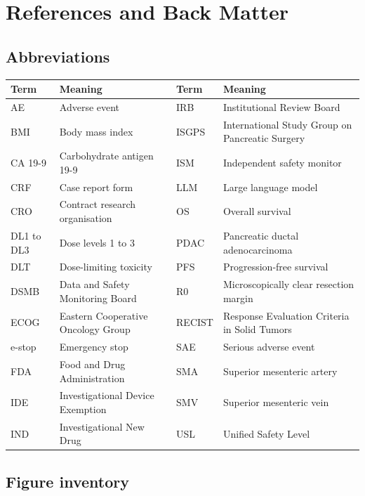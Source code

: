 \section{References and Back Matter}

\subsection{Abbreviations}

\vspace{0.30em}

\noindent\begin{tabularx}{\textwidth}{L{2.3cm} Y L{2.3cm} Y}
\toprule
\textbf{Term} & \textbf{Meaning} & \textbf{Term} & \textbf{Meaning} \\
\midrule
AE & Adverse event & IRB & Institutional Review Board \\
BMI & Body mass index & ISGPS & International Study Group on Pancreatic Surgery \\
CA 19-9 & Carbohydrate antigen 19-9 & ISM & Independent safety monitor \\
CRF & Case report form & LLM & Large language model \\
CRO & Contract research organisation & OS & Overall survival \\
DL1 to DL3 & Dose levels 1 to 3 & PDAC & Pancreatic ductal adenocarcinoma \\
DLT & Dose-limiting toxicity & PFS & Progression-free survival \\
DSMB & Data and Safety Monitoring Board & R0 & Microscopically clear resection margin \\
ECOG & Eastern Cooperative Oncology Group & RECIST & Response Evaluation Criteria in Solid Tumors \\
e-stop & Emergency stop & SAE & Serious adverse event \\
FDA & Food and Drug Administration & SMA & Superior mesenteric artery \\
IDE & Investigational Device Exemption & SMV & Superior mesenteric vein \\
IND & Investigational New Drug & USL & Unified Safety Level \\
\bottomrule
\end{tabularx}

\vspace{0.30em}

\subsection{Figure inventory}

